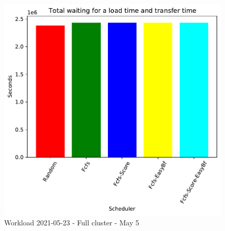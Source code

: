 \documentclass[a4paper]{article}
\begin{document}
\begin{figure}[H]
	\begin{minipage}[b]{0.5\linewidth}\centering\includegraphics[width=1.11\linewidth]{MBSS/plot/2021-05-23_Total_waiting_for_a_load_time_and_transfer_time.pdf}\caption{Waiting for a load + Transfer time}\vspace{4ex}\end{minipage}\caption{Workload 2021-05-23 - Full cluster - May 5}\end{figure}
	
\end{document}
